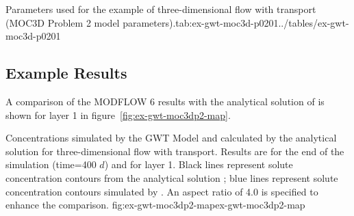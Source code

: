 \begin{StandardTable}{Parameters used for the example of three-dimensional flow with transport (MOC3D Problem 2 model parameters).}{tab:ex-gwt-moc3d-p0201}{../tables/ex-gwt-moc3d-p0201}
\end{StandardTable}

\subsection{Example Results}

A comparison of the MODFLOW 6 results with the analytical solution of \cite{wexler1992} is shown for layer 1 in figure~\ref{fig:ex-gwt-moc3dp2-map}.

\begin{StandardFigure}{
                                     Concentrations simulated by the \mf GWT Model and calculated by the analytical solution for three-dimensional flow with transport.  Results are for the end of the simulation (time=400 $d$) and for layer 1.  Black lines represent solute concentration contours from the analytical solution \citep{wexler1992}; blue lines represent solute concentration contours simulated by \mf.  An aspect ratio of 4.0 is specified to enhance the comparison.
                                     }{fig:ex-gwt-moc3dp2-map}{ex-gwt-moc3dp2-map}
\end{StandardFigure}            

                
